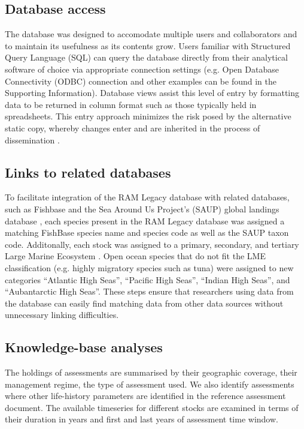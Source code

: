 \documentclass[letterpaper,12pt]{article}
\begin{document}
\subsection{Database access}
The database was designed to accomodate multiple users and
collaborators and to maintain its usefulness as its contents grow.
Users familiar with Structured Query Language (SQL) can query the
database directly from their analytical software of choice via
appropriate connection settings (e.g. Open Database Connectivity
(ODBC) connection and other examples can be found in the Supporting
Information).  Database views assist this level of entry by formatting
data to be returned in column format such as those typically held in
spreadsheets. This entry approach minimizes the risk posed by the
alternative static copy, whereby changes enter and are inherited in
the process of dissemination \citep[for a literary
example]{Barbrook:Howe:Blake:Robinson:1998:nature}.

\subsection{ Links to related databases}
To facilitate integration of the RAM Legacy database with related
databases, such as Fishbase \citep{Froese:Pauly:2009:fishbase} and the
Sea Around Us Project's (SAUP) global landings database
\citep{Watson:etal:2005:fandf}, each species present in the RAM Legacy
database was assigned a matching FishBase species name and species
code as well as the SAUP taxon code. Additonally, each stock was
assigned to a primary, secondary, and tertiary Large Marine Ecosystem
\citep{NOAA:LME64:1998}. Open ocean species that do not fit the LME
classification (e.g. highly migratory species such as tuna) were
assigned to new categories ``Atlantic High Seas'', ``Pacific High
Seas'', ``Indian High Seas'', and ``Aubantarctic High Seas''.  These
steps ensure that researchers using data from the database can easily
find matching data from other data sources without unnecessary linking
difficulties.


\subsection{Knowledge-base analyses}
The holdings of assessments are summarised by their geographic
coverage, their management regime, the type of assessment used. We
also identify assessments where other life-history parameters are
identified in the reference assessment document. The available
timeseries for different stocks are examined in terms of their
duration in years and first and last years of assessment time window.
\end{document}
